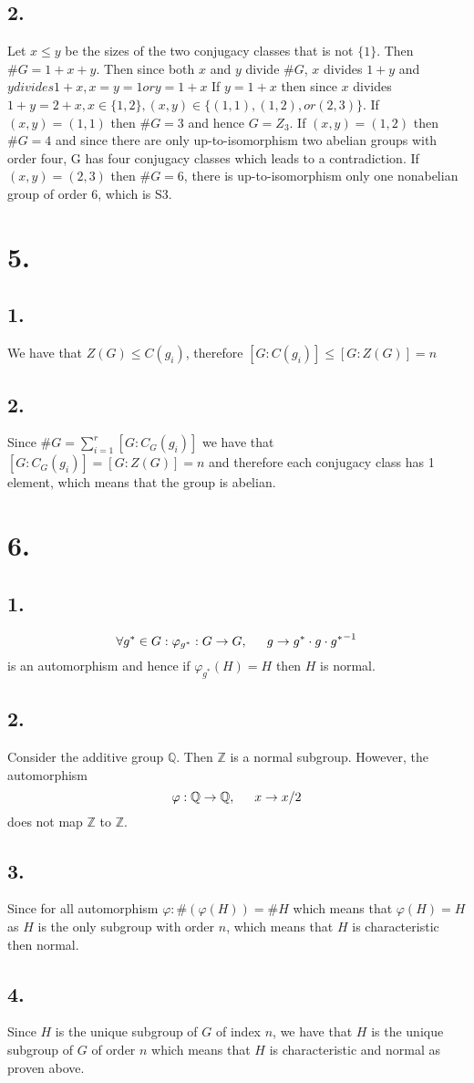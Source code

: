 \documentclass[11pt]{article}
\begin{document}
\subsection*{2.}
Let $x\le y$ be the sizes of the two conjugacy classes that is not $\{1\}$. Then $\#G = 1 + x + y$.  
Then since both $x$ and $y$ divide $\#G$, $x$ divides $1 + y$ and $y divides 1 + x, x=y=1 or y = 1 + x$ 
If $y = 1 + x$ then since $x$ divides $1 + y = 2 + x, x \in \{1,2\}, (x,y) \in  \{(1,1), (1,2), or (2,3)\}.$ 
If $(x,y) = (1,1)$ then $\#G =3$ and hence $G = Z_3$. 
If $(x,y) = (1,2)$ then $\#G =4$ and since there are only up-to-isomorphism two abelian groups with order four, 
G has four conjugacy classes which leads to a contradiction. 
If $(x,y) = (2,3)$ then $\#G =6$, there is up-to-isomorphism only one nonabelian group of order 6, which is S3.
\pagebreak
\section*{5.}
\subsection*{1.}
We have that $Z(G) \le C(g_i)$, therefore $[G:C(g_i)] \le [G:Z(G)] = n$
\subsection*{2.}
Since $\#G = \sum_{i=1}^r [G:C_G(g_i)]$ we have that $[G:C_G(g_i)] = [G:Z(G)] = n$ and 
therefore each conjugacy class has 1 element, which means that the group is abelian.
\pagebreak
\section*{6.}
\subsection*{1.}
\[
    \forall g^* \in G: \varphi_{g^*}: G \to G, \indent g \to g^* \cdot g \cdot {g^*}^{-1} 
\]
is an automorphism and hence if $\varphi_{g^*}(H) = H$ then $H$ is normal.
\subsection*{2.}
Consider the additive group $\mathbb{Q}$. Then $\mathbb{Z}$ is a normal subgroup. However, the automorphism 
\[
\varphi: \mathbb{Q} \to \mathbb{Q}, \indent x \to x/2     
\]
does not map $\mathbb{Z}$ to $\mathbb{Z}$.
\subsection*{3.}
Since for all automorphism $\varphi: \# (\varphi(H)) = \#H$ which means that $\varphi(H) = H$ 
as $H$ is the only subgroup with order $n$, which means that $H$ is characteristic then normal.
\subsection*{4.}
Since $H$ is the unique subgroup of $G$ of index $n$, we have that $H$ is the unique subgroup of $G$ of order $n$
which means that $H$ is characteristic and normal as proven above. 
\end{document}
